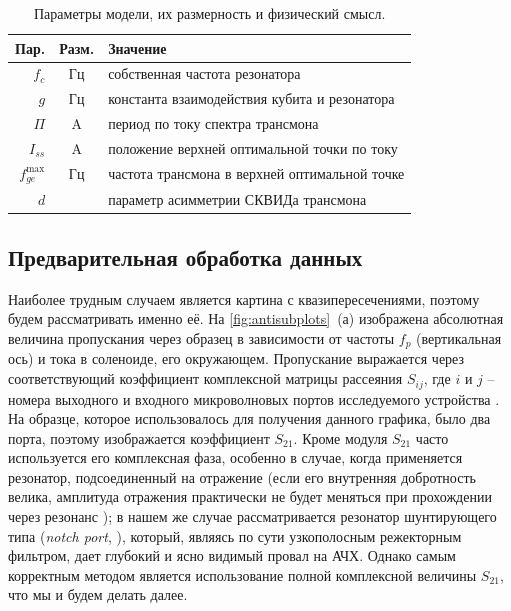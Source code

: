 \documentclass[14pt, a4paper]{extreport}
\numberwithin{equation}{section}
\begin{document}
\begin{table}
	\centering
	\small{\begin{tabular}{r c l}\toprule
			Пар. & Разм. & Значение\\\midrule 
			$f_c$ & Гц & собственная частота резонатора \\ 
			$g$ & Гц & константа взаимодействия кубита и резонатора \\
			$\Pi$ & A & период по току спектра трансмона \\
			$I_{ss}$ & A & положение верхней оптимальной точки по току \\
			$f_{ge}^\text{max}$ & Гц & частота трансмона в верхней оптимальной точке \\
			$d$ & & параметр асимметрии СКВИДа трансмона\\
			\bottomrule
	\end{tabular}}
	\caption{Параметры модели, их размерность и физический смысл.}
	\label{tab:pars}
\end{table}

\subsection{Предварительная обработка данных}

Наиболее трудным случаем является картина с квазипересечениями, поэтому будем рассматривать именно её. На \autoref{fig:antisubplots}~(а) изображена абсолютная величина пропускания через образец в зависимости от частоты $f_p$ (вертикальная ось) и тока в соленоиде, его окружающем. Пропускание выражается через соответствующий коэффициент комплексной матрицы рассеяния $S_{ij}$, где $i$ и $j$ -- номера выходного и входного микроволновых портов исследуемого устройства \cite{pozar2011microwave}. На образце, которое использовалось для получения данного графика, было два порта, поэтому изображается коэффициент $S_{21}$. Кроме модуля $S_{21}$ часто используется его комплексная фаза, особенно в случае, когда применяется резонатор, подсоединенный на отражение (если его внутренняя добротность велика, амплитуда отражения практически не будет меняться при прохождении через резонанс \cite{probst2015efficient}); в нашем же случае рассматривается резонатор шунтирующего типа (\foreignlanguage{english}{\textit{notch port}}, \cite{probst2015efficient}), который, являясь по сути узкополосным режекторным фильтром, дает глубокий и ясно видимый провал на АЧХ. Однако самым корректным методом является использование полной комплексной величины $S_{21}$, что мы и будем делать далее.
\end{document}
